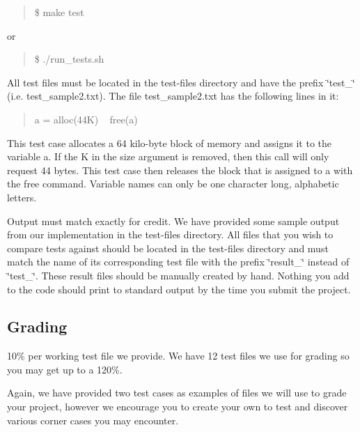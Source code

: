 \begin{quote}
{\ttfamily \$ make test} \end{quote}
or \begin{quote}
{\ttfamily \$ ./run\+\_\+tests.sh} \end{quote}


All test files must be located in the test-\/files directory and have the prefix \char`\"{}test\+\_\+\char`\"{} (i.\+e. test\+\_\+sample2.\+txt). The file test\+\_\+sample2.\+txt has the following lines in it\+:

\begin{quote}
{\ttfamily a = alloc(44\+K)} ~\newline
 {\ttfamily free(a)} \end{quote}


This test case allocates a 64 kilo-\/byte block of memory and assigns it to the variable \textquotesingle{}a\textquotesingle{}. If the \textquotesingle{}K\textquotesingle{} in the size argument is removed, then this call will only request 44 bytes. This test case then releases the block that is assigned to \textquotesingle{}a\textquotesingle{} with the free command. Variable names can only be one character long, alphabetic letters.

Output must match exactly for credit. We have provided some sample output from our implementation in the test-\/files directory. All files that you wish to compare tests against should be located in the test-\/files directory and must match the name of its corresponding test file with the prefix \char`\"{}result\+\_\+\char`\"{} instead of \char`\"{}test\+\_\+\char`\"{}. These result files should be manually created by hand. Nothing you add to the code should print to standard output by the time you submit the project.

\subsection*{Grading}

10\% per working test file we provide. We have 12 test files we use for grading so you may get up to a 120\%.

Again, we have provided two test cases as examples of files we will use to grade your project, however we encourage you to create your own to test and discover various corner cases you may encounter. 